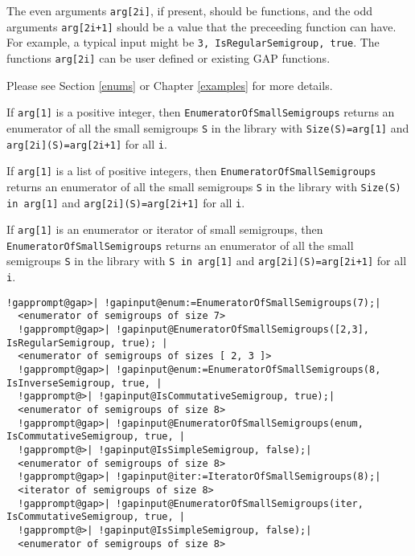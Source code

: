 \documentclass[a4paper,11pt]{report}
\begin{document}
{{{ The even arguments \texttt{arg[2i]}, if present, should be functions, and the odd arguments \texttt{arg[2i+1]} should be a value that the preceeding function can have. For example, a
typical input might be \texttt{3, IsRegularSemigroup, true}. The functions \texttt{arg[2i]} can be user defined or existing \textsf{GAP} functions.

 Please see Section \ref{enums} or Chapter \ref{examples} for more details. 

 If \texttt{arg[1]} is a positive integer, then \texttt{EnumeratorOfSmallSemigroups} returns an enumerator of all the small semigroups \texttt{S} in the library with \texttt{Size(S)=arg[1]} and \texttt{arg[2i](S)=arg[2i+1]} for all \texttt{i}. 

 If \texttt{arg[1]} is a list of positive integers, then \texttt{EnumeratorOfSmallSemigroups} returns an enumerator of all the small semigroups \texttt{S} in the library with \texttt{Size(S) in arg[1]} and \texttt{arg[2i](S)=arg[2i+1]} for all \texttt{i}. 

 If \texttt{arg[1]} is an enumerator or iterator of small semigroups, then \texttt{EnumeratorOfSmallSemigroups} returns an enumerator of all the small semigroups \texttt{S} in the library with \texttt{S in arg[1]} and \texttt{arg[2i](S)=arg[2i+1]} for all \texttt{i}. 

 
\begin{Verbatim}[commandchars=!@|,fontsize=\small,frame=single,label=Example]
  !gapprompt@gap>| !gapinput@enum:=EnumeratorOfSmallSemigroups(7);|
  <enumerator of semigroups of size 7>
  !gapprompt@gap>| !gapinput@EnumeratorOfSmallSemigroups([2,3], IsRegularSemigroup, true); |
  <enumerator of semigroups of sizes [ 2, 3 ]>
  !gapprompt@gap>| !gapinput@enum:=EnumeratorOfSmallSemigroups(8, IsInverseSemigroup, true, |
  !gapprompt@>| !gapinput@IsCommutativeSemigroup, true);|
  <enumerator of semigroups of size 8>
  !gapprompt@gap>| !gapinput@EnumeratorOfSmallSemigroups(enum, IsCommutativeSemigroup, true, |
  !gapprompt@>| !gapinput@IsSimpleSemigroup, false);|
  <enumerator of semigroups of size 8>
  !gapprompt@gap>| !gapinput@iter:=IteratorOfSmallSemigroups(8);|
  <iterator of semigroups of size 8>
  !gapprompt@gap>| !gapinput@EnumeratorOfSmallSemigroups(iter, IsCommutativeSemigroup, true, |
  !gapprompt@>| !gapinput@IsSimpleSemigroup, false);|
  <enumerator of semigroups of size 8>
\end{Verbatim}
 }

 

}}
\end{document}
